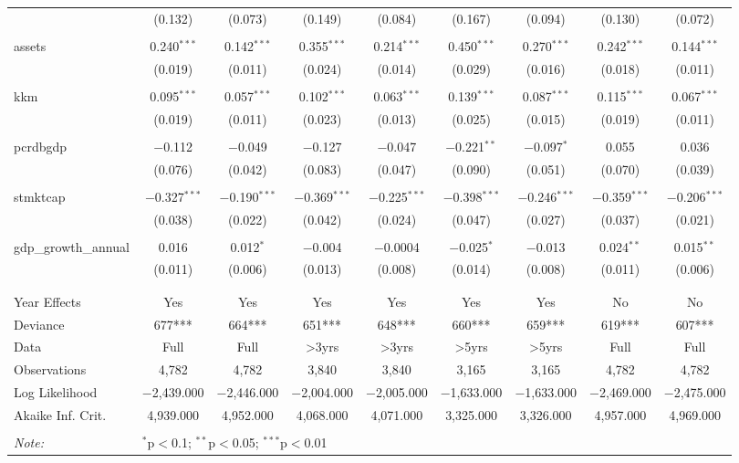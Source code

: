 \documentclass[a4paper, nobind]{templates/ociamthesis}
\begin{document}
\begin{landscape}
\begin{table}[!htbp]
\begin{tabular}{@{\extracolsep{5pt}}lcccccccc}
  & (0.132) & (0.073) & (0.149) & (0.084) & (0.167) & (0.094) & (0.130) & (0.072) \\ 
  & & & & & & & & \\ 
 assets & 0.240$^{***}$ & 0.142$^{***}$ & 0.355$^{***}$ & 0.214$^{***}$ & 0.450$^{***}$ & 0.270$^{***}$ & 0.242$^{***}$ & 0.144$^{***}$ \\ 
  & (0.019) & (0.011) & (0.024) & (0.014) & (0.029) & (0.016) & (0.018) & (0.011) \\ 
  & & & & & & & & \\ 
 kkm & 0.095$^{***}$ & 0.057$^{***}$ & 0.102$^{***}$ & 0.063$^{***}$ & 0.139$^{***}$ & 0.087$^{***}$ & 0.115$^{***}$ & 0.067$^{***}$ \\ 
  & (0.019) & (0.011) & (0.023) & (0.013) & (0.025) & (0.015) & (0.019) & (0.011) \\ 
  & & & & & & & & \\ 
 pcrdbgdp & $-$0.112 & $-$0.049 & $-$0.127 & $-$0.047 & $-$0.221$^{**}$ & $-$0.097$^{*}$ & 0.055 & 0.036 \\ 
  & (0.076) & (0.042) & (0.083) & (0.047) & (0.090) & (0.051) & (0.070) & (0.039) \\ 
  & & & & & & & & \\ 
 stmktcap & $-$0.327$^{***}$ & $-$0.190$^{***}$ & $-$0.369$^{***}$ & $-$0.225$^{***}$ & $-$0.398$^{***}$ & $-$0.246$^{***}$ & $-$0.359$^{***}$ & $-$0.206$^{***}$ \\ 
  & (0.038) & (0.022) & (0.042) & (0.024) & (0.047) & (0.027) & (0.037) & (0.021) \\ 
  & & & & & & & & \\ 
 gdp\_growth\_annual & 0.016 & 0.012$^{*}$ & $-$0.004 & $-$0.0004 & $-$0.025$^{*}$ & $-$0.013 & 0.024$^{**}$ & 0.015$^{**}$ \\ 
  & (0.011) & (0.006) & (0.013) & (0.008) & (0.014) & (0.008) & (0.011) & (0.006) \\ 
  & & & & & & & & \\ 
\hline \\[-1.8ex] 
Year Effects & Yes & Yes & Yes & Yes & Yes & Yes & No & No \\ 
Deviance & 677*** & 664*** & 651*** & 648*** & 660*** & 659*** & 619*** & 607*** \\ 
Data & Full & Full & >3yrs & >3yrs & >5yrs & >5yrs & Full & Full \\ 
Observations & 4,782 & 4,782 & 3,840 & 3,840 & 3,165 & 3,165 & 4,782 & 4,782 \\ 
Log Likelihood & $-$2,439.000 & $-$2,446.000 & $-$2,004.000 & $-$2,005.000 & $-$1,633.000 & $-$1,633.000 & $-$2,469.000 & $-$2,475.000 \\ 
Akaike Inf. Crit. & 4,939.000 & 4,952.000 & 4,068.000 & 4,071.000 & 3,325.000 & 3,326.000 & 4,957.000 & 4,969.000 \\ 
\hline 
\hline \\[-1.8ex] 
\textit{Note:}  & \multicolumn{8}{l}{$^{*}$p$<$0.1; $^{**}$p$<$0.05; $^{***}$p$<$0.01} \\ 
\end{tabular} 
\end{table}

\end{landscape}
\end{document}
